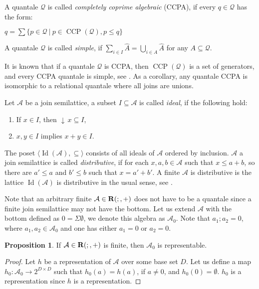 \documentclass[a4paper]{article}
\theoremstyle{definition}
\theoremstyle{theorem}
\theoremstyle{proposition}
\newtheorem{proposition}{Proposition}
\theoremstyle{lemma}
\theoremstyle{ex}
\theoremstyle{corollary}
\theoremstyle{claim}
\newcommand{\down}[1]{\ensuremath{{\downarrow}\,#1}}
\begin{document}
A quantale $\mathcal{Q}$ is called \emph{completely coprime algebraic} (CCPA), if every $q \in \mathcal{Q}$ has the form:
\begin{center}
  $q = \sum \limits \{ p \in \mathcal{Q} \: | \: p \in \operatorname{CCP}(\mathcal{Q}), p \leq q \}$
\end{center}

A quantale $\mathcal{Q}$ is called \emph{simple}, if
$\sum \limits_{i \in I} \widehat{A} = \bigcup \limits_{i \in A} \widehat{A}$ for any $A \subseteq \mathcal{Q}$.

It is known that if a quantale $\mathcal{Q}$ is CCPA, then $\operatorname{CCP}(\mathcal{Q})$ is a set of generators, and every CCPA quantale is simple, see \cite[Lemma 5.3, Lemma 5.5, and Proposition 5.6]{brown1993representation}. As a corollary, any quantale CCPA is isomorphic to a relational quantale where all joins are unions.

Let $\mathcal{A}$ be a join semilattice, a subset $I \subseteq \mathcal{A}$ is called \emph{ideal}, if the following hold:
\begin{enumerate}
  \item If $x \in I$, then $\down{x} \subseteq I$,
  \item $x, y \in I$ implies $x + y \in I$.
\end{enumerate}
The poset $\langle \operatorname{Id}(\mathcal{A}), \subseteq \rangle$ consists of all ideals of $\mathcal{A}$ ordered by inclusion. $\mathcal{A}$ a join semilattice is called \emph{distributive}, if for each $x, a, b \in \mathcal{A}$ such that $x \leq a + b$, so there are $a' \leq a$ and $b' \leq b$ such that $x = a' + b'$. A finite $\mathcal{A}$ is distributive is the lattice $\operatorname{Id}(\mathcal{A})$ is distributive in the usual sense, see \cite[Lemma 184]{gratzer2011lattice}.

Note that an arbitrary finite $\mathcal{A} \in {\bf R}(;,+)$ does not have to be a quantale since a finite join semilattice may not have the bottom. Let us extend $\mathcal{A}$ with the bottom defined as $0 = \Sigma \emptyset$, we denote this algebra as $\mathcal{A}_0$. Note that $a_1 ; a_2 = 0$, where $a_1, a_2 \in \mathcal{A}_0$ and one has either $a_1 = 0$ or $a_2 = 0$.

\begin{proposition}
  If $\mathcal{A} \in {\bf R}(;,+)$ is finite, then $\mathcal{A}_0$ is representable.
\end{proposition}

\begin{proof}
  Let $h$ be a representation of $\mathcal{A}$ over some base set $D$. Let us define a map $h_0 : \mathcal{A}_0 \to 2^{D \times D}$ such that $h_0(a) = h(a)$, if $a \neq 0$, and $h_0(0) = \emptyset$. $h_0$ is a representation since $h$ is a representation.
\end{proof}
\end{document}

